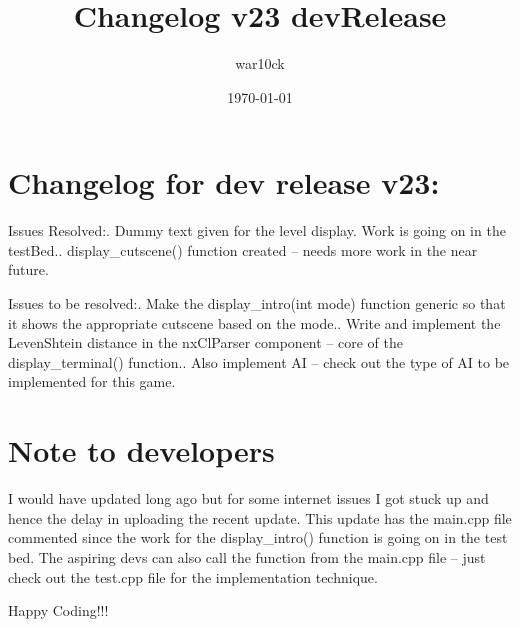 \documentclass[a4paper]{article}
\begin{document}
\title{Changelog v23 devRelease}	%
\author{war10ck}	%
\date{\today}
\maketitle

\section{Changelog for dev release v23:}
Issues Resolved:. Dummy text given for the level display. Work is going on in the testBed.. display\_cutscene() function created -- needs more work in the near future.\newline

Issues to be resolved:. Make the display\_intro(int mode) function generic so that it shows the appropriate cutscene based on the mode.. Write and implement the LevenShtein distance in the nxClParser component -- core of the display\_terminal() function.. Also implement AI -- check out the type of AI to be implemented for this game.\newline

\section{Note to developers}
I would have updated long ago but for some internet issues I got stuck up and hence the delay in uploading the recent update. This update has the main.cpp file commented since the work for the display\_intro() function is going on in the test bed. The aspiring devs can also call the function from the main.cpp file -- just check out the test.cpp file for the implementation technique.\newline

Happy Coding!!!\newline
\pagebreak
\end{document}
